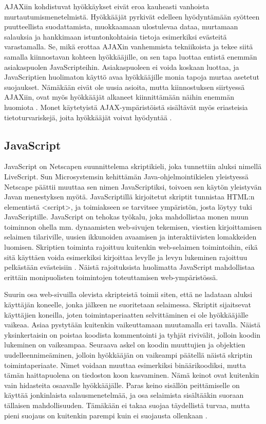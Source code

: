 AJAXiin kohdistuvat hyökkäykset eivät eroa kauheasti vanhoista murtautumismenetelmistä. Hyökkääjät pyrkivät edelleen hyödyntämään syötteen puutteellista suodattamista, muokkaamaan ulostulevaa
dataa, murtamaan salauksia ja hankkimaan istuntonkohtaisia tietoja esimerkiksi evästeitä varastamalla. Se, mikä erottaa AJAXin vanhemmista tekniikoista ja tekee siitä samalla kiinnostavan
kohteen hyökkääjille, on sen tapa luottaa entistä enemmän asiakaspuolen JavaScripteihin. Asiakaspuoleen ei voida koskaan luottaa, ja JavaScriptien huolimaton käyttö avaa hyökkääjille monia
tapoja murtaa asetetut suojaukset. Nämäkään eivät ole uusia asioita, mutta kiinnostuksen siirtyessä AJAXiin, ovat myös hyökkääjät alkaneet kiinnittämään näihin enemmän huomiota \cite{AJAX}.
Monet käytetyistä AJAX-ympäristöistä sisältävät myös eriasteisia tietoturvariskejä, joita hyökkääjät voivat hyödyntää \cite{JSH}.

\subsection{JavaScript}

JavaScript on Netscapen suunnittelema skriptikieli, joka tunnettiin aluksi nimellä LiveScript. Sun Microsystemsin kehittämän Java-ohjelmointikielen yleistyessä Netscape päättii muuttaa 
sen nimen JavaScriptiksi, toivoen sen käytön yleistyvän Javan menestyksen myötä. JavaScriptillä kirjoitetut skriptit tunnistaa HTML:n elementistä <script>, ja toimiakseen se tarvitsee ympäristön,
josta löytyy tuki JavaScriptille. JavaScript on tehokas työkalu, joka  mahdollistaa monen muun toiminnon ohella mm. dynaamisten web-sivujen tekemisen, viestien kirjoittamisen selaimen 
tilariville, uusien ikkunoiden avaamisen ja interaktiivisten lomakkeiden luomisen. Skriptien toiminta rajoittuu kuitenkin web-selaimen toimintoihin, eikä sitä käyttäen voida esimerkiksi 
kirjoittaa levylle ja levyn lukeminen rajoittuu pelkästään evästeisiin \cite{JavaScript}. Näistä rajoituksista huolimatta JavaScript mahdollistaa erittäin monipuolisten toimintojen 
toteuttamisen web-ympäristössä.

Suurin osa web-sivuilla olevista skripteistä toimii siten, että ne ladataan aluksi käyttäjän koneelle, jonka jälkeen ne suoritetaan selaimessa. Skriptit sijaitsevat käyttäjien 
koneilla, joten toimintaperiaatten selvittäminen ei ole hyökkääjälle vaikeaa. Asiaa pystytään kuitenkin vaikeuttamaan muutamalla eri tavalla. Näistä yksinkertaisin on poistaa koodista
kommentointi ja tyhjät rivivälit, jolloin koodin lukeminen on vaikeampaa. Seuraava askel on koodin muuttujien ja objektien uudelleennimeäminen, jolloin hyökkääjän on vaikeampi päätellä näistä
skriptin toimintaperiaate. Nimet voidaan muuttaa esimerkiksi binäärikoodiksi, mutta tämän haittapuolena on tiedoston koon kasvaminen. Nämä keinot ovat kuitenkin vain hidasteita osaavalle 
hyökkääjälle. Paras keino sisällön peittämiselle on käyttää jonkinlaista salausmenetelmää, ja osa selaimista sisältääkin suoraan tällaisen mahdollisuuden. Tämäkään ei takaa suojaa täydellistä
turvaa, mutta pieni suojaus on kuitenkin parempi kuin ei suojausta ollenkaan \cite{AJAX}.

